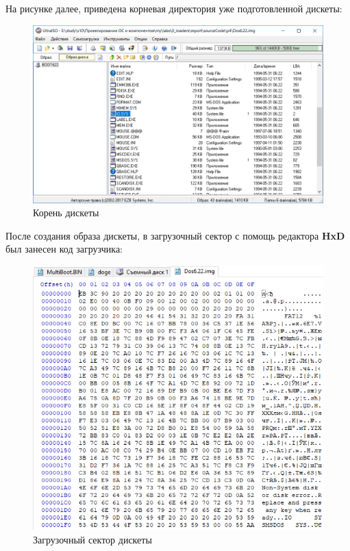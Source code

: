 На рисунке далее, приведена корневая директория уже подготовленной дискеты:
\begin{figure}[H]
  \centering
  \includegraphics[width=\textwidth]{img/p4/1}
  \caption{Корень дискеты}
\end{figure}
После создания образа дискеты, в загрузочный сектор с помощь редактора \textbf{HxD} был занесен код загрузчика:
\begin{figure}[H]
  \centering
  \includegraphics[width=.8\textwidth]{img/p4/2}
  \caption{Загрузочный сектор дискеты}
\end{figure}
